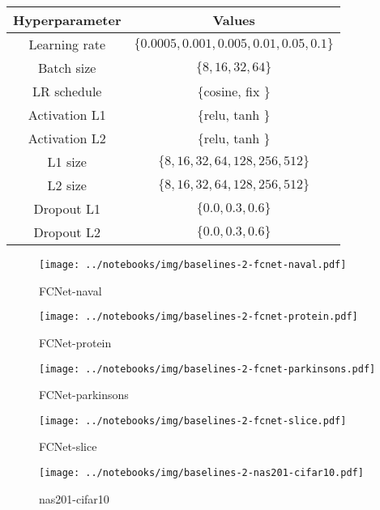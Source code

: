 \begin{table}
    \centering
\begin{tabular}{cc}
    \textbf{Hyperparameter} & \textbf{Values} \\ \midrule
    Learning rate & $\{0.0005, 0.001, 0.005, 0.01, 0.05, 0.1\}$ \\
    Batch size & $\{8, 16, 32, 64\}$ \\
    LR schedule & $\{$cosine, fix $\}$ \\
    Activation L1 & $\{$relu, tanh $\}$ \\
    Activation L2 & $\{$relu, tanh $\}$ \\
    L1 size & $\{8, 16, 32, 64, 128, 256, 512\}$ \\
    L2 size & $\{8, 16, 32, 64, 128, 256, 512\}$ \\
    Dropout L1 & $\{0.0, 0.3, 0.6\}$ \\
    Dropout L2 & $\{0.0, 0.3, 0.6\}$
    \end{tabular}
\end{table}


\begin{figure}[H]
    \centering
    \texttt{[image: ../notebooks/img/baselines-2-fcnet-naval.pdf]}
    \caption{FCNet-naval}
\end{figure}

\begin{figure}[H]
    \centering
    \texttt{[image: ../notebooks/img/baselines-2-fcnet-protein.pdf]}
    \caption{FCNet-protein}
\end{figure}


\begin{figure}[H]
    \centering
    \texttt{[image: ../notebooks/img/baselines-2-fcnet-parkinsons.pdf]}
    \caption{FCNet-parkinsons}
\end{figure}

\begin{figure}[H]
    \centering
    \texttt{[image: ../notebooks/img/baselines-2-fcnet-slice.pdf]}
    \caption{FCNet-slice}
\end{figure}




\begin{figure}[H]
    \centering
    \texttt{[image: ../notebooks/img/baselines-2-nas201-cifar10.pdf]}
    \caption{nas201-cifar10}
\end{figure}

